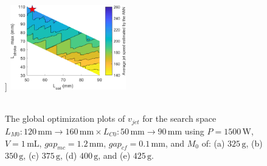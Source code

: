 \begin{figure}[!ht]
                ]{
                    \includegraphics[width=0.45\textwidth]{chap4/images/PMLSM_RSM_325g.png}
                    \label{fig:chapter/rsm/PMLSM/results/375}
                }
                \qquad
                \\
                \\
                \caption{
                    The global optimization plots of $v_{jet}$ for the search space $L_{M0}:120\,\mathrm{mm}\rightarrow 160\,\mathrm{mm} \times L_{C0}:50\,\mathrm{mm}\rightarrow 90\,\mathrm{mm}$ using $P=1500\,\mathrm{W}$, $V=1\,\mathrm{mL}$, $gap_{mc}=1.2\,\mathrm{mm}$, $gap_{cf}=0.1\,\mathrm{mm}$,  and $M_0$ of: (a) $325\,\mathrm{g}$, (b) $350\,\mathrm{g}$, (c) $375\,\mathrm{g}$, (d) $400\,\mathrm{g}$, and (e) $425\,\mathrm{g}$.
                }   \label{fig:chapter/rsm/PMLSM/results}
            \end{figure}
    
